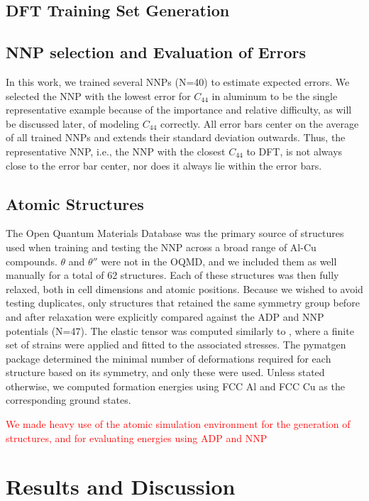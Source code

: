 \documentclass{article}
\begin{document}
\subsection{DFT Training Set Generation}
\subsection{NNP selection and Evaluation of Errors}
In this work, we trained several NNPs (N=40) to estimate expected errors. We selected the NNP with the lowest error for $C_{44}$ in aluminum to be the single representative example because of the importance and relative difficulty, as will be discussed later, of modeling $C_{44}$ correctly. All error bars center on the average of all trained NNPs and extends their standard deviation outwards. Thus, the representative NNP, i.e., the NNP with the closest $C_{44}$ to DFT, is not always close to the error bar center, nor does it always lie within the error bars. 
\subsection{Atomic Structures}
The Open Quantum Materials Database \cite{Kirklin2015} was the primary source of structures used when training and
testing the NNP across a broad range of Al-Cu compounds. $\theta$ and $\theta''$ were not in the OQMD, and we
included them as well manually for a total of 62 structures. Each of these structures was then fully relaxed, 
both in cell dimensions and atomic positions. Because we wished to avoid testing duplicates, only structures that retained the same symmetry group before and after relaxation were explicitly compared against the ADP and NNP
potentials (N=47). The elastic tensor was computed similarly to \cite{DeJong2015}, where a finite set of strains were
applied and fitted to the associated stresses. The pymatgen package\cite{Ong2013} determined the minimal number of
deformations required for each structure based on its symmetry, and only these were used. 
Unless stated otherwise, we computed formation energies using FCC Al and FCC Cu as the corresponding ground states. 

\textcolor{red}{We made heavy use of the atomic simulation environment for the generation of structures, and for evaluating energies using ADP and NNP \cite{HjorthLarsen2017}}

\section{Results and Discussion}
\end{document}
